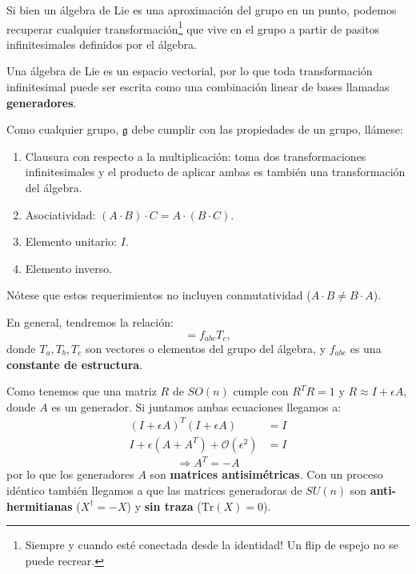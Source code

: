 \documentclass[]{article}
\numberwithin{equation}{section}
\begin{document}
Si bien un álgebra de Lie es una aproximación del grupo en un punto, podemos recuperar cualquier transformación\footnote{Siempre y cuando esté conectada desde la identidad! Un flip de espejo no se puede recrear.} que vive en el grupo a partir de pasitos infinitesimales definidos por el álgebra.

Una álgebra de Lie es un espacio vectorial, por lo que toda transformación infinitesimal puede ser escrita como una combinación linear de bases llamadas \textbf{generadores}.

Como cualquier grupo, \(\mathfrak{g}\) debe cumplir con las propiedades de un grupo, llámese:
\begin{enumerate}
	\item Clausura con respecto a la multiplicación: toma dos transformaciones infinitesimales y el producto de aplicar ambas es también una transformación del álgebra.
	\item Asociatividad: \((A\cdot B)\cdot C = A\cdot(B\cdot C) \).
	\item Elemento unitario: \(I\).
	\item Elemento inverso.
\end{enumerate}
Nótese que estos requerimientos no incluyen conmutatividad (\(A\cdot B \neq B\cdot A\)).


En general, tendremos la relación:
\begin{equation}
	[T_a,T_b]=f_{abc}T_c,
\end{equation}
donde \(T_a,T_b,T_c\) son vectores o elementos del grupo del álgebra, y \(f_{abc}\) es una \textbf{constante de estructura}.

Como tenemos que una matriz \(R\) de \(SO(n)\) cumple con \(R^T R = 1\) y \(R \approx I + \epsilon A\), donde \(A\) es un generador. Si juntamos ambas ecuaciones llegamos a:
\begin{align*}
	(I + \epsilon A)^T (I + \epsilon A) &= I\\
	I + \epsilon(A + A^T) + \mathcal{O}(\epsilon^2) &= I
\end{align*}
\begin{equation}
	\Rightarrow A^T = -A
\end{equation}
por lo que los generadores \(A\) son \textbf{matrices antisimétricas}. Con un proceso idéntico también llegamos a que las matrices generadoras de \(SU(n)\) son \textbf{anti-hermitianas} (\(X^\dagger=-X\)) y \textbf{sin traza} (\(\text{Tr}(X)=0\)).
\end{document}
